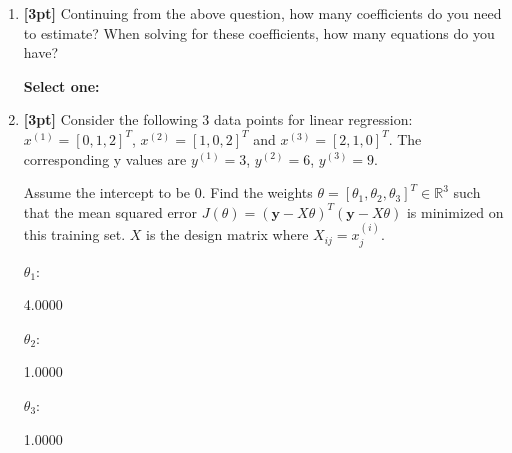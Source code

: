 \begin{enumerate}
    
    
    \clearpage
    
    \item \textbf{[3pt]} Continuing from the above question, how many coefficients do you need to estimate? When solving for these coefficients, how many equations do you have?
    
    \textbf{Select one:}
    
    
    \item \textbf{[3pt]} Consider the following 3 data points for linear regression: $x^{(1)} = [0, 1, 2]^T$, $x^{(2)} = [1, 0, 2]^T$ and $x^{(3)} = [2, 1, 0]^T$. The corresponding y values are $y^{(1)}=3$, $y^{(2)}=6$, $y^{(3)}=9$.
    
    Assume the intercept to be 0. Find the weights $\theta = [\theta_1,  \theta_2,  \theta_3]^T \in \mathbb{R}^3$ such that the mean squared error $J(\theta) = (\textbf{y} - X\theta)^T(\textbf{y} - X\theta)$ is minimized on this training set. $X$ is the design matrix where $X_{ij} = x_j^{(i)}$. 
    
    $\theta_1$: \quad
    \begin{tcolorbox}[fit,height=1cm, width=4cm, blank, borderline={1pt}{-2pt},nobeforeafter]
    \begin{center}\huge4.0000\end{center}
    \end{tcolorbox}
    
    
    $\theta_2$: \quad
    \begin{tcolorbox}[fit,height=1cm, width=4cm, blank, borderline={1pt}{-2pt},nobeforeafter]
    \begin{center}\huge1.0000\end{center}
    \end{tcolorbox}
    
    
    $\theta_3$: \quad
    \begin{tcolorbox}[fit,height=1cm, width=4cm, blank, borderline={1pt}{-2pt},nobeforeafter]
    \begin{center}\huge1.0000\end{center}
    \end{tcolorbox}
    

\end{enumerate}
